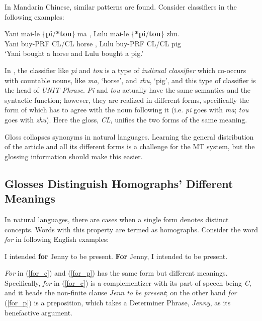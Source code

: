 \documentclass[final]{ua-thesis}
\numberwithin{equation}{section}
\begin{document}
In Mandarin Chinese, similar patterns are found. Consider classifiers in the following examples:

\begin{exe}
\ex \label{chinese_cl_eg}
\gll Yani mai-le \{\textbf{pi}/\textbf{*tou}\} ma , Lulu mai-le \{\textbf{*pi}/\textbf{tou}\} zhu.\\ 
Yani buy-PRF CL/CL horse , Lulu buy-PRF CL/CL pig\\
\glt `Yani bought a horse and Lulu bought a pig.' \citep[p. 136]{zhang2013classifier}
\end{exe}

In \citet{zhang2013classifier}, the classifier like \textit{pi} and \textit{tou} is a type of \textit{indivual classifier} which co-occurs with countable nouns, like \textit{ma}, `horse', and \textit{zhu}, `pig', and this type of classifier is the head of \textit{UNIT Phrase}. 
\textit{Pi} and \textit{tou} actually have the same semantics and the syntactic function; however, they are realized in different forms, specifically the form of which has to agree with the noun following it (i.e. \textit{pi} goes with \textit{ma}; \textit{tou} goes with \textit{zhu}). Here the gloss, \textit{CL}, unifies the two forms of the same meaning.    

Gloss collapses synonyms in natural languages. Learning the general distribution of the article and all its different forms is a challenge for the MT system, but the glossing information should make this easier.

\subsection{Glosses Distinguish Homographs' Different Meanings}\label{sec:disa}

In natural languages, there are cases when a single form denotes distinct concepts. Words with this property are termed as homographs. Consider the word \textit{for} in following English examples:

\begin{exe}
\ex \label{for_eng}
	\begin{xlist}
	\ex \label{for_c}I intended \textbf{for} Jenny to be present.
	\ex \label{for_p}\textbf{For} Jenny, I intended to be present. \citep[p.306-307]{adger2003core}
	\end{xlist}
\end{exe}

\textit{For} in (\ref{for_c}) and (\ref{for_p}) has the same form but different meanings. Specifically, \textit{for} in (\ref{for_c}) is a complementizer with its part of speech being \textit{C}, and it heads the non-finite clause \textit{Jenn to be present}; on the other hand \textit{for} (\ref{for_p}) is a preposition, which takes a Determiner Phrase, \textit{Jenny}, as its benefactive argument.   
\end{document}
